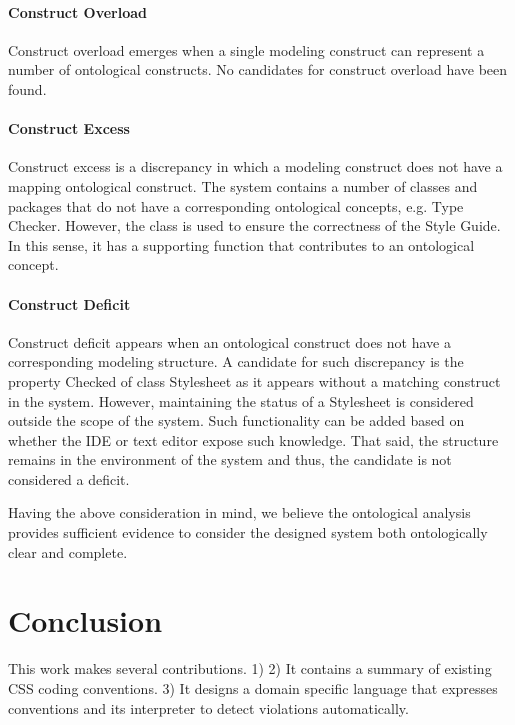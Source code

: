 \documentclass[parskip=full]{uvamscse}
\begin{document}
\subsubsection{Construct Overload}

Construct overload emerges when a single modeling construct can represent a number of ontological
constructs. No candidates for construct overload have been found.

\subsubsection{Construct Excess}

Construct excess is a discrepancy in which a modeling construct does not have a mapping ontological construct. The system contains a number of classes and packages that do not have a corresponding ontological concepts, e.g. Type Checker. However, the class is used to ensure the correctness of the Style Guide. In this sense, it has a supporting function that contributes to an ontological concept.

\subsubsection{Construct Deficit}

Construct deficit appears when an ontological construct does not have a corresponding modeling
structure. A candidate for such discrepancy is the property Checked of class Stylesheet as it
appears without a matching construct in the system. However, maintaining the status of a Stylesheet
is considered outside the scope of the system. Such functionality can be added based on whether the
IDE or text editor expose such knowledge. That said, the structure remains in the environment of the
system and thus, the candidate is not considered a deficit.

Having the above consideration in mind, we believe the ontological analysis provides sufficient evidence to consider the designed system both ontologically clear and complete.


\chapter{Conclusion}

This work makes several contributions. 1) 2) It contains a summary of existing
CSS coding conventions. 3) It designs a domain specific language that expresses
conventions and its interpreter to detect violations automatically.

{%


}
\end{document}
